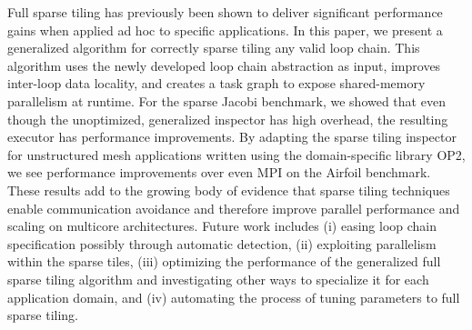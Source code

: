 Full sparse tiling has previously been shown to deliver significant            
performance gains when applied ad hoc to specific applications. In              
this paper, we present a generalized algorithm for correctly sparse             
tiling any valid loop chain. This algorithm uses the newly developed            
loop chain abstraction as input, improves inter-loop data locality,             
and creates a task graph to expose shared-memory parallelism at                 
runtime. For the sparse Jacobi benchmark, we showed that even though            
the unoptimized, generalized inspector has high overhead, the                   
resulting executor has performance improvements. By adapting the                
sparse tiling inspector for unstructured mesh applications written              
using the domain-specific library OP2, we see performance improvements          
over even MPI on the Airfoil benchmark. These results add to the                
growing body of evidence that sparse tiling techniques enable                   
communication avoidance and therefore improve parallel performance and          
scaling on multicore architectures. Future work includes (i) easing             
loop chain specification possibly through automatic detection,          
(ii) exploiting parallelism within the sparse tiles, (iii)                 
optimizing the performance of the generalized full sparse tiling                
algorithm and investigating other ways to specialize it for each                
application domain, and (iv) automating the process of tuning                   
parameters to full sparse tiling.
